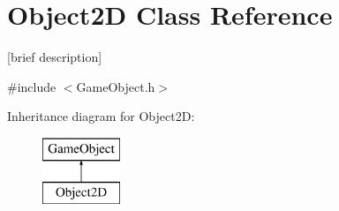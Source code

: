 \hypertarget{class_object2_d}{\section{Object2\-D Class Reference}
\label{class_object2_d}
}


\mbox{[}brief description\mbox{]}  




{\ttfamily \#include $<$Game\-Object.\-h$>$}

Inheritance diagram for Object2\-D\-:\begin{figure}[H]
\begin{center}
\leavevmode
\includegraphics[height=2.000000cm]{class_object2_d}
\end{center}
\end{figure}
